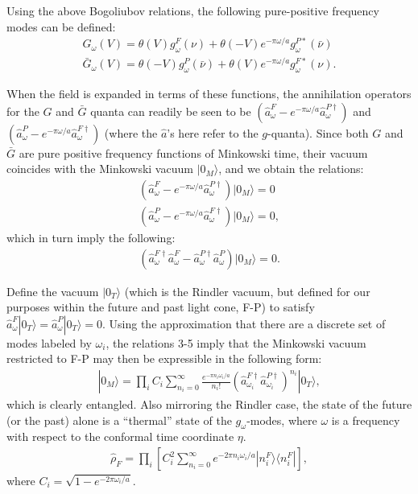 \documentclass[aps,prl,twocolumn,showpacs]{revtex4}
\begin{document}
Using the above Bogoliubov relations, the following pure-positive frequency modes can be defined:
\begin{eqnarray*}
G_{\omega}(V) = \theta(V)g^{F}_{\omega}(\nu) + \theta(-V) e^{- \pi \omega / a} g^{P \ast}_{\omega}(\bar{\nu}) \\
\bar{G}_{\omega}(V) = \theta(-V)g^{P}_{\omega}(\bar{\nu}) + \theta(V) e^{- \pi \omega / a} g^{F \ast}_{\omega}(\nu).
\end{eqnarray*}

When the field is expanded in terms of these functions, the annihilation operators for the $G$ and $\bar{G}$ quanta can readily be seen to be $(\hat{a}^{F}_{\omega} - e^{- \pi \omega /a} \hat{a}^{P \dagger}_{\omega})$ and $(\hat{a}^{P}_{\omega} - e^{- \pi \omega / a} \hat{a}^{F \dagger}_{\omega} )$ (where the $\hat{a}$'s here refer to the $g$-quanta).  Since both $G$ and $\bar{G}$ are pure positive frequency functions of Minkowski time, their vacuum coincides with the Minkowski vacuum $|0_{M} \rangle$, and we obtain the relations:
\begin{eqnarray}
(\hat{a}^{F}_{\omega} - e^{- \pi \omega /a} \hat{a}^{P \dagger}_{\omega}) |0_{M} \rangle = 0 \\
(\hat{a}^{P}_{\omega} - e^{- \pi \omega / a} \hat{a}^{F \dagger}_{\omega} ) |0_{M} \rangle = 0 ,
\end{eqnarray}
which in turn imply the following:
\begin{eqnarray}
(\hat{a}^{F \dagger}_{\omega} \hat{a}^{F}_{\omega} - \hat{a}^{P \dagger}_{\omega} \hat{a}^{P}_{\omega}) |0_{M} \rangle = 0.
\end{eqnarray}

Define the vacuum $|0_{T} \rangle$ (which is the Rindler vacuum, but defined for our purposes within the future and past light cone, F-P) to satisfy $\hat{a}^{F}_{\omega} |0_{T} \rangle = \hat{a}^{P}_{\omega} |0_{T} \rangle = 0$.  Using the approximation that there are a discrete set of modes labeled by $\omega_{i}$, the relations 3-5 imply that the Minkowski vacuum restricted to F-P may then be expressible in the following form:
\begin{eqnarray}
|0_{M} \rangle = \prod_{i} C_{i} \sum_{n_{i}=0}^{\infty} \frac{e^{- \pi n_{i} \omega_{i} /a}}{n_{i} !}( \hat{a}^{F \dagger}_{\omega_{i}}\hat{a}^{P \dagger}_{\omega_{i}})^{n_{i}} |0_{T} \rangle,
\end{eqnarray}
which is clearly entangled.  Also mirroring the Rindler case, the state of the future (or the past) alone is a ``thermal'' state of the $g_{\omega}$-modes, where $\omega$ is a frequency with respect to the conformal time coordinate $\eta$.
\begin{eqnarray}
\hat{\rho}_{F} = \prod_{i} \left[ C_{i}^{2} \sum_{n_{i} =0}^{\infty} e^{- 2 \pi n_{i} \omega_{i} /a} |n_{i}^{F} \rangle \langle n_{i}^{F} | \right],
\end{eqnarray}
where $C_{i} = \sqrt{1 - e^{-2 \pi \omega_{i} /a}}$.
\end{document}
